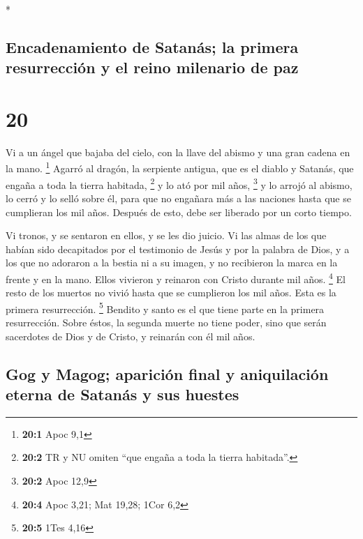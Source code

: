 \begin{paracol}{2}
\begin{otherlanguage}{english}
\end{otherlanguage}

\switchcolumn[0]*

\hypertarget{encadenamiento-de-satanuxe1s-la-primera-resurrecciuxf3n-y-el-reino-milenario-de-paz}{%
\subsection{Encadenamiento de Satanás; la primera resurrección y el
reino milenario de
paz}\label{encadenamiento-de-satanuxe1s-la-primera-resurrecciuxf3n-y-el-reino-milenario-de-paz}}

\hypertarget{section-38}{%
\section{20}\label{section-38}}

 Vi a un ángel que bajaba del cielo, con la llave del
abismo y una gran cadena en la mano. \footnote{\textbf{20:1} Apoc 9,1}
 Agarró al dragón, la serpiente antigua, que es el diablo
y Satanás, que engaña a toda la tierra habitada, \footnote{\textbf{20:2}
  TR y NU omiten ``que engaña a toda la tierra habitada''.} y lo ató por
mil años, \footnote{\textbf{20:2} Apoc 12,9}  y lo arrojó
al abismo, lo cerró y lo selló sobre él, para que no engañara más a las
naciones hasta que se cumplieran los mil años. Después de esto, debe ser
liberado por un corto tiempo.

 Vi tronos, y se sentaron en ellos, y se les dio juicio.
Vi las almas de los que habían sido decapitados por el testimonio de
Jesús y por la palabra de Dios, y a los que no adoraron a la bestia ni a
su imagen, y no recibieron la marca en la frente y en la mano. Ellos
vivieron y reinaron con Cristo durante mil años. \footnote{\textbf{20:4}
  Apoc 3,21; Mat 19,28; 1Cor 6,2}  El resto de los muertos
no vivió hasta que se cumplieron los mil años. Esta es la primera
resurrección. \footnote{\textbf{20:5} 1Tes 4,16}  Bendito
y santo es el que tiene parte en la primera resurrección. Sobre éstos,
la segunda muerte no tiene poder, sino que serán sacerdotes de Dios y de
Cristo, y reinarán con él mil años.

\hypertarget{gog-y-magog-apariciuxf3n-final-y-aniquilaciuxf3n-eterna-de-satanuxe1s-y-sus-huestes}{%
\subsection{Gog y Magog; aparición final y aniquilación eterna de
Satanás y sus
huestes}\label{gog-y-magog-apariciuxf3n-final-y-aniquilaciuxf3n-eterna-de-satanuxe1s-y-sus-huestes}}


\end{paracol}
